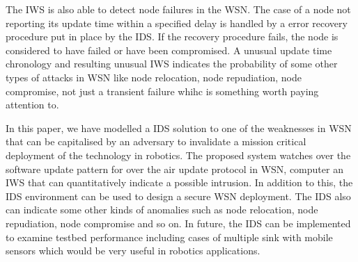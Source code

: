 \documentclass[conference,final]{IEEEtran}
\newcommand{\notedme}[1]{\raisebox{0pt}[0pt][0pt]{\pdfcomment[open=true,color=blue]{#1}}}
\begin{document}
The IWS is also able to detect node failures in the WSN.
The case of a node not reporting its update time within a specified delay is handled by a error recovery procedure put in place by the IDS.
If the recovery procedure fails, the node is considered to have failed or have been compromised.
A unusual update time chronology and resulting unusual IWS  indicates the probability of some other types of attacks in WSN like node relocation, node repudiation, node compromise, not just a transient failure whihc is something worth paying attention to.


In this paper, we have modelled a IDS solution to one of the weaknesses in WSN that can be capitalised by an adversary to invalidate a mission critical deployment of the technology in robotics. 
The proposed system watches over the software update pattern for over the air update protocol in WSN, computer an IWS that can quantitatively indicate a possible intrusion.
In addition to this, the IDS environment can be used to design a secure WSN deployment.
The IDS also can indicate some other kinds of anomalies such as node relocation, node repudiation, node compromise and so on.
In future,  the IDS can be implemented to examine testbed performance including cases of multiple sink with mobile sensors which would be very useful in robotics applications.
\end{document}
